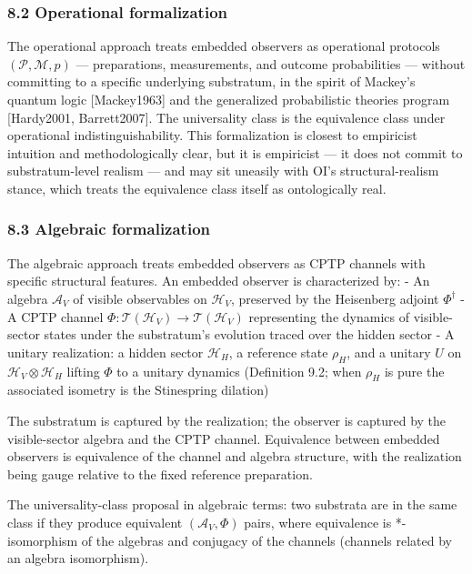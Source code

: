 \documentclass[
]{article}
\begin{document}
\hypertarget{operational-formalization}{%
\subsubsection{8.2 Operational
formalization}\label{operational-formalization}}

The operational approach treats embedded observers as operational
protocols \((\mathcal{P}, \mathcal{M}, p)\) --- preparations,
measurements, and outcome probabilities --- without committing to a
specific underlying substratum, in the spirit of Mackey's quantum logic
{[}Mackey1963{]} and the generalized probabilistic theories program
{[}Hardy2001, Barrett2007{]}. The universality class is the equivalence
class under operational indistinguishability. This formalization is
closest to empiricist intuition and methodologically clear, but it is
empiricist --- it does not commit to substratum-level realism --- and
may sit uneasily with OI's structural-realism stance, which treats the
equivalence class itself as ontologically real.

\hypertarget{algebraic-formalization}{%
\subsubsection{8.3 Algebraic
formalization}\label{algebraic-formalization}}

The algebraic approach treats embedded observers as CPTP channels with
specific structural features. An embedded observer is characterized by:
- An algebra \(\mathcal A_V\) of visible observables on
\(\mathcal H_V\), preserved by the Heisenberg adjoint \(\Phi^\dagger\) -
A CPTP channel
\(\Phi:\mathcal T(\mathcal H_V)\to\mathcal T(\mathcal H_V)\)
representing the dynamics of visible-sector states under the
substratum's evolution traced over the hidden sector - A unitary
realization: a hidden sector \(\mathcal{H}_H\), a reference state
\(\rho_H\), and a unitary \(U\) on
\(\mathcal{H}_V \otimes \mathcal{H}_H\) lifting \(\Phi\) to a unitary
dynamics (Definition 9.2; when \(\rho_H\) is pure the associated
isometry is the Stinespring dilation)

The substratum is captured by the realization; the observer is captured
by the visible-sector algebra and the CPTP channel. Equivalence between
embedded observers is equivalence of the channel and algebra structure,
with the realization being gauge relative to the fixed reference
preparation.

The universality-class proposal in algebraic terms: two substrata are in
the same class if they produce equivalent \((\mathcal{A}_V, \Phi)\)
pairs, where equivalence is *-isomorphism of the algebras and conjugacy
of the channels (channels related by an algebra isomorphism).
\end{document}
